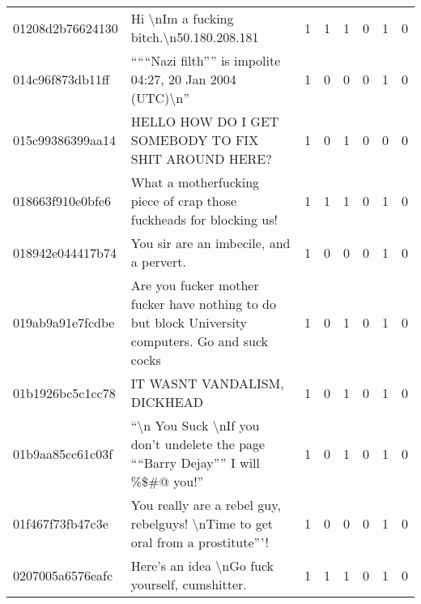 \begin{sidewaystable}[htb!]
\begin{tabularx}{\textwidth}{L{0.8} L{6.6} C{0.1} C{0.1} C{0.1} C{0.1} C{0.1} C{0.1}}
        01208d2b76624130 & Hi \textbackslash nIm a fucking bitch.\textbackslash n50.180.208.181                                                             & 1           & 1           & 1           & 0           & 1           & 0           \\
        014c96f873db11ff & ``````Nazi filth'''' is impolite 04:27, 20 Jan 2004 (UTC)\textbackslash n''                                                      & 1           & 0           & 0           & 0           & 1           & 0           \\
        015c99386399aa14 & HELLO HOW DO I GET SOMEBODY TO FIX SHIT AROUND HERE?                                                                             & 1           & 0           & 1           & 0           & 0           & 0           \\
        018663f910e0bfe6 & What a motherfucking piece of crap those fuckheads for blocking us!                                                              & 1           & 1           & 1           & 0           & 1           & 0           \\
        018942e044417b74 & You sir are an imbecile, and a pervert.                                                                                          & 1           & 0           & 0           & 0           & 1           & 0           \\
        019ab9a91e7fcdbe & Are you fucker mother fucker have nothing to do but block University computers. Go and suck cocks                                & 1           & 0           & 1           & 0           & 1           & 0           \\
        01b1926bc5c1cc78 & IT WASNT VANDALISM, DICKHEAD                                                                                                     & 1           & 0           & 1           & 0           & 1           & 0           \\
        01b9aa85cc61c03f & ``\textbackslash n You Suck \textbackslash nIf you don't undelete the page ````Barry Dejay'''' I will \%\$\#@ you!''             & 1           & 0           & 1           & 0           & 1           & 0           \\
        01f467f73fb47c3e & You really are a rebel guy, rebelguys! \textbackslash nTime to get oral from a prostitute'''!                                    & 1           & 0           & 0           & 0           & 1           & 0           \\
        0207005a6576eafc & Here's an idea \textbackslash nGo fuck yourself, cumshitter.                                                                     & 1           & 1           & 1           & 0           & 1           & 0           \\

\end{tabularx}
\end{sidewaystable}
